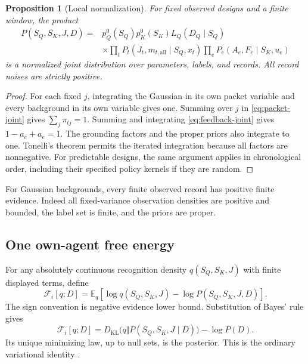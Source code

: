 \documentclass[11pt]{article}
\newtheorem{proposition}[theorem]{Proposition}
\theoremstyle{definition}
\theoremstyle{remark}
\newcommand{\E}{\mathbb E}
\newcommand{\KL}{D_{\mathrm{KL}}}
\newcommand{\calF}{\mathcal F}
\newcommand{\SQ}{S_{Q}}
\newcommand{\SK}{S_{K}}
\begin{document}
\begin{proposition}[Local normalization]
For fixed observed designs and a finite window, the product
\begin{equation}
\begin{split}
P(\SQ,\SK,J,D)
={}&p_Q^0(\SQ)p_K^0(\SK)L_Q(D_Q\mid\SQ)\\
&\times\prod_tP_t(J_t,m_{t,\mathrm{all}}\mid\SQ,x_t)
\prod_eP_e(A_e,F_e\mid\SK,u_e)
\end{split}
\label{eq:local-model}
\end{equation}
is a normalized joint distribution over parameters, labels, and records. All record noises are strictly positive.
\end{proposition}
\begin{proof}
For each fixed \(j\), integrating the Gaussian in its own packet variable and every background in its own variable gives one. Summing over \(j\) in \eqref{eq:packet-joint} gives \(\sum_j\pi_{tj}=1\). Summing and integrating \eqref{eq:feedback-joint} gives \(1-a_e+a_e=1\). The grounding factors and the proper priors also integrate to one. Tonelli's theorem permits the iterated integration because all factors are nonnegative. For predictable designs, the same argument applies in chronological order, including their specified policy kernels if they are random.
\end{proof}

For Gaussian backgrounds, every finite observed record has positive finite evidence. Indeed all fixed-variance observation densities are positive and bounded, the label set is finite, and the priors are proper.

\subsection{One own-agent free energy}

For any absolutely continuous recognition density \(q(\SQ,\SK,J)\) with finite displayed terms, define
\begin{equation}
\calF_i[q;D]
=
\E_q\left[\log q(\SQ,\SK,J)-\log P(\SQ,\SK,J,D)\right].
\label{eq:vfe}
\end{equation}
The sign convention is negative evidence lower bound. Substitution of Bayes' rule gives
\begin{equation}
\boxed{
\calF_i[q;D]
=
\KL\bigl(q\Vert P(\SQ,\SK,J\mid D)\bigr)-\log P(D).
}
\label{eq:vfe-identity}
\end{equation}
Its unique minimizing law, up to null sets, is the posterior. This is the ordinary variational identity \citep{NealHinton1998}.
\end{document}
